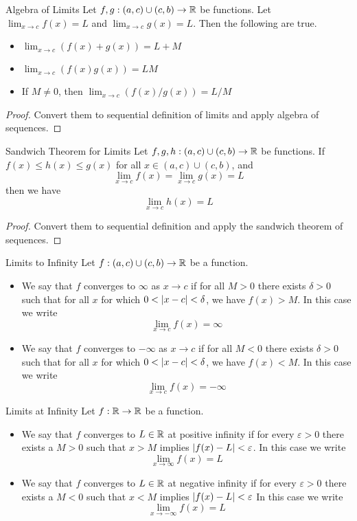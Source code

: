\documentclass[a4paper]{article}
\begin{document}
\begin{prp}{Algebra of Limits}{} Let $f,g:(a,c)\cup(c,b)\to\mathbb{R}$ be functions. Let $\lim_{x\to c}f(x)=L$ and $\lim_{x\to c}g(x)=L$. Then the following are true. 
\begin{itemize}
\item $\lim_{x\to c}\left(f(x)+g(x)\right)=L+M$
\item $\lim_{x\to c}\left(f(x)g(x)\right)=LM$
\item If $M\neq 0$, then $\lim_{x\to c}(f(x)/g(x))=L/M$
\end{itemize}\tcbline
\begin{proof} Convert them to sequential definition of limits and apply algebra of sequences. 
\end{proof}
\end{prp}

\begin{thm}{Sandwich Theorem for Limits}{} Let $f,g,h:(a,c)\cup(c,b)\to\mathbb{R}$ be functions. If $f(x)\leq h(x)\leq g(x)$ for all $x\in (a,c)\cup(c,b)$, and $$\lim_{x\to c}f(x)=\lim_{x\to c}g(x)=L$$ then we have $$\lim_{x\to c}h(x)=L$$ \tcbline
\begin{proof} Convert them to sequential definition and apply the sandwich theorem of sequences. 
\end{proof}
\end{thm}

\begin{defn}{Limits to Infinity}{} Let $f:(a,c)\cup(c,b)\to\mathbb{R}$ be a function. 
\begin{itemize} 
\item We say that $f$ converges to $\infty$ as $x\to c$ if for all $M>0$ there exists $\delta>0$ such that for all $x$ for which $0<\abs{x-c}<\delta$, we have $f(x)>M$. In this case we write $$\lim_{x\to c}f(x)=\infty$$
\item We say that $f$ converges to $-\infty$ as $x\to c$ if for all $M<0$ there exists $\delta>0$ such that for all $x$ for which $0<\abs{x-c}<\delta$, we have $f(x)<M$. In this case we write $$\lim_{x\to c}f(x)=-\infty$$
\end{itemize}
\end{defn}

\begin{defn}{Limits at Infinity}{} Let $f:\mathbb{R}\to\mathbb{R}$ be a function. 
\begin{itemize} 
\item We say that $f$ converges to $L\in\mathbb{R}$ at positive infinity if for every $\varepsilon>0$ there exists a $M>0$ such that $x>M$ implies $\abs{f(x)-L}<\varepsilon$. In this case we write $$\lim_{x\to\infty}f(x)=L$$
\item We say that $f$ converges to $L\in\mathbb{R}$ at negative infinity if for every $\varepsilon>0$ there exists a $M<0$ such that $x<M$ implies $\abs{f(x)-L}<\varepsilon$ In this case we write $$\lim_{x\to-\infty}f(x)=L$$
\end{itemize}
\end{defn}
\end{document}
